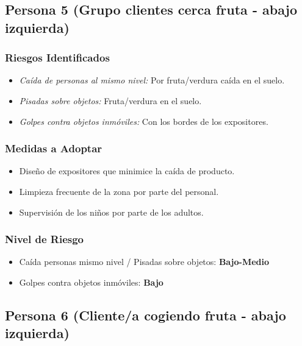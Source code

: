 \documentclass[12pt,a4paper]{article}
\begin{document}
	\bigskip\hrulefill\bigskip
	
	\subsection{Persona 5 (Grupo clientes cerca fruta - abajo izquierda)}
	
	\subsubsection{Riesgos Identificados}
	\begin{itemize}
		\item \textit{Caída de personas al mismo nivel:} Por fruta/verdura caída en el suelo.
		\item \textit{Pisadas sobre objetos:} Fruta/verdura en el suelo.
		\item \textit{Golpes contra objetos inmóviles:} Con los bordes de los expositores.
	\end{itemize}
	
	\subsubsection{Medidas a Adoptar}
	\begin{itemize}
		\item Diseño de expositores que minimice la caída de producto.
		\item Limpieza frecuente de la zona por parte del personal.
		\item Supervisión de los niños por parte de los adultos.
	\end{itemize}
	
	\subsubsection{Nivel de Riesgo}
	\begin{itemize}
		\item Caída personas mismo nivel / Pisadas sobre objetos: \textbf{Bajo-Medio}
		\item Golpes contra objetos inmóviles: \textbf{Bajo}
	\end{itemize}
	
	\bigskip\hrulefill\bigskip
	
	\subsection{Persona 6 (Cliente/a cogiendo fruta - abajo izquierda)}
	
\end{document}
